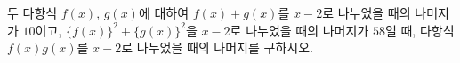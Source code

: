 두 다항식 $f(x)$, $g(x)$에 대하여 $f(x)+g(x)$를 $x-2$로 나누었을 때의 나머지가 $10$이고, $\{f(x)\}^2+\{g(x)\}^2$을 $x-2$로 나누었을 때의 나머지가 $58$일 때, 다항식 $f(x)g(x)$를 $x-2$로 나누었을 때의 나머지를 구하시오.

